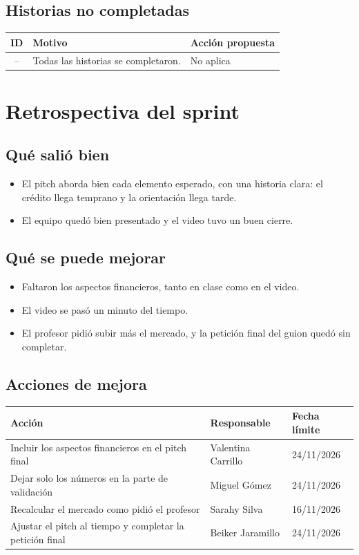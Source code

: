 \documentclass[11pt,a4paper]{article}
\begin{document}
\subsection{Historias no completadas}
\begin{tabularx}{\textwidth}{c X X}
  \toprule
  \textbf{ID} & \textbf{Motivo} & \textbf{Acción propuesta} \\
  \midrule
  -- & Todas las historias se completaron. & No aplica \\
  \bottomrule
\end{tabularx}

\section{Retrospectiva del sprint}

\subsection{Qué salió bien}
\begin{itemize}[leftmargin=1.5em]
  \item {El pitch aborda bien cada elemento esperado, con una historia clara: el crédito llega temprano y la orientación llega tarde.}
  \item {El equipo quedó bien presentado y el video tuvo un buen cierre.}
\end{itemize}

\subsection{Qué se puede mejorar}
\begin{itemize}[leftmargin=1.5em]
  \item {Faltaron los aspectos financieros, tanto en clase como en el video.}
  \item {El video se pasó un minuto del tiempo.}
  \item {El profesor pidió subir más el mercado, y la petición final del guion quedó sin completar.}
\end{itemize}

\subsection{Acciones de mejora}
\begin{tabularx}{\textwidth}{X l l}
  \toprule
  \textbf{Acción} & \textbf{Responsable} & \textbf{Fecha límite} \\
  \midrule
  Incluir los aspectos financieros en el pitch final & Valentina Carrillo & 24/11/2026 \\
  Dejar solo los números en la parte de validación & Miguel Gómez & 24/11/2026 \\
  Recalcular el mercado como pidió el profesor & Sarahy Silva & 16/11/2026 \\
  Ajustar el pitch al tiempo y completar la petición final & Beiker Jaramillo & 24/11/2026 \\
  \bottomrule
\end{tabularx}
\end{document}
